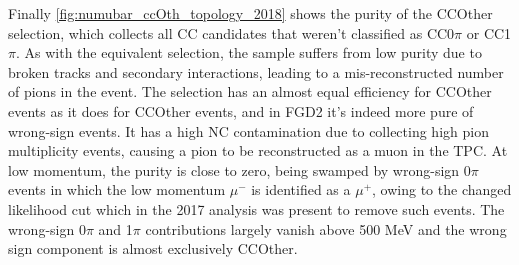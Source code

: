 Finally \autoref{fig:numubar_ccOth_topology_2018} shows the purity of the \numubar CCOther selection, which collects all \numubar CC candidates that weren't classified as CC0$\pi$ or CC1$\pi$. As with the equivalent \numu selection, the sample suffers from low purity due to broken tracks and secondary interactions, leading to a mis-reconstructed number of pions in the event. The selection has an almost equal efficiency for \numubar CCOther events as it does for \numu CCOther events, and in FGD2 it's indeed more pure of wrong-sign events. It has a high NC contamination due to collecting high pion multiplicity events, causing a pion to be reconstructed as a muon in the TPC.  At low momentum, the purity is close to zero, being swamped by wrong-sign 0$\pi$ events in which the low momentum $\mu^-$ is identified as a $\mu^+$, owing to the changed likelihood cut which in the 2017 analysis was present to remove such events. The wrong-sign 0$\pi$ and 1$\pi$ contributions largely vanish above 500 MeV and the wrong sign component is almost exclusively \numu CCOther.
